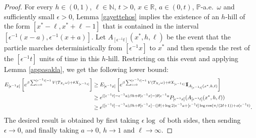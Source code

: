 \documentclass[a4paper]{amsart}
\numberwithin{equation}{section}
\theoremstyle{plain}
\theoremstyle{remark}
\begin{document}
\begin{proof}
For every $h\in(0,1)$, $\ell\in\mathbb{N}$, $t>0$, $x\in\mathbb{R}$, $a\in(0,t)$, $\mathbb{P}$-a.e.\ $\omega$ and sufficiently small ${\epsilon}>0$, Lemma \ref{gayettehos} implies the existence of an $h$-hill of the form $[x^* - \ell,x^* + \ell - 1]$ that is contained in the interval $[{\epsilon^{-1}}(x-a),{\epsilon^{-1}}(x+a)]$. Let $A_{[{\epsilon^{-1}} t]}(x^*,h,\ell)$ be the event that the particle marches deterministically from $[{\epsilon^{-1}} x]$
to $x^*$ and then spends the rest of the $[{\epsilon^{-1}} t]$ units of time in this $h$-hill. Restricting on this event and applying Lemma \ref{appasakla}, we get the following lower bound:
\begin{align*}
E_{[{\epsilon^{-1}} x]}\left[e^{\beta\sum_{i=0}^{[{\epsilon^{-1}} t]-1}V(T_{X_i}\omega) + \theta X_{[{\epsilon^{-1}} t]}}\right] &\ge E_{[{\epsilon^{-1}} x]}\left[e^{\beta\sum_{i=0}^{[{\epsilon^{-1}} t]-1}V(T_{X_i}\omega) + \theta X_{[{\epsilon^{-1}} t]}}{{{\rm 1\mkern-1.5mu}\!{\rm I}}}_{A_{[{\epsilon^{-1}} t]}(x^*,h,\ell)}\right]\\
&\ge e^{([{\epsilon^{-1}} t] - {\epsilon^{-1}} a)\beta h + \theta[{\epsilon^{-1}} x] - |\theta|{\epsilon^{-1}} a}P_{[{\epsilon^{-1}} x]}(A_{[{\epsilon^{-1}} t]}(x^*,h,\ell))\\
&\ge e^{([{\epsilon^{-1}} t] - {\epsilon^{-1}} a)\beta h + \theta[{\epsilon^{-1}} x] - (|\theta| + \log 2){\epsilon^{-1}} a + [{\epsilon^{-1}} t]\log\cos(\pi/(2\ell + 1)) + o({\epsilon^{-1}} t)}.
\end{align*}
The desired result is obtained by first taking ${\epsilon}\log$ of both sides, then sending ${\epsilon}\to0$, and finally taking $a\to0$, $h\to 1$ and $\ell\to\infty$.
\end{proof}
\end{document}
